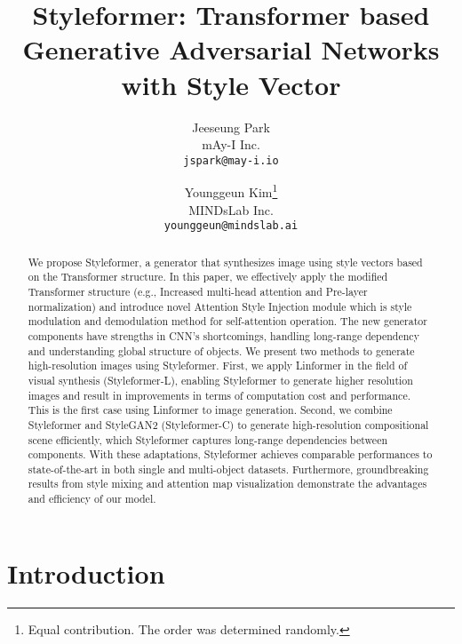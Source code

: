 \documentclass[10pt,twocolumn,letterpaper]{article}
\begin{document}
\title{Styleformer: Transformer based Generative Adversarial Networks with Style Vector}


\author{Jeeseung Park\\
mAy-I Inc.\\
{\tt\small jspark@may-i.io}
\and
Younggeun Kim\thanks{Equal contribution. The order was determined randomly.}\\
MINDsLab Inc.\\
{\tt\small younggeun@mindslab.ai}
}
\maketitle

\begin{abstract}


 We propose Styleformer, a generator that synthesizes image using style vectors based on the Transformer structure. 
In this paper, we effectively apply the modified Transformer structure (e.g., Increased multi-head attention and Pre-layer normalization) and introduce novel Attention Style Injection module which is style modulation and demodulation method for self-attention operation.
The new generator components have strengths in CNN's shortcomings, handling long-range dependency and understanding global structure of objects. 
We present two methods to generate high-resolution images using Styleformer. 
First, we apply Linformer in the field of visual synthesis (Styleformer-L), enabling Styleformer to generate higher resolution images and result in improvements in terms of computation cost and performance. This is the first case using Linformer to image generation.
Second, we combine Styleformer and StyleGAN2 (Styleformer-C) to generate high-resolution compositional scene efficiently, which Styleformer captures long-range dependencies between components. With these adaptations, Styleformer achieves comparable performances to state-of-the-art in both single and multi-object datasets. Furthermore, groundbreaking results from style mixing and attention map visualization demonstrate the advantages and efficiency of our model.











\end{abstract}

\section{Introduction}
\label{sec:intro}
\end{document}
